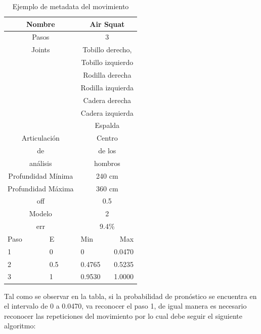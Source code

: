 \documentclass[twoside,twocolumn]{article}
\begin{document}
\begin{table}[H]
\caption{Ejemplo de metadata del movimiento}
\centering
\begin{tabular}{lllr}
\toprule
\multicolumn{2}{c}{Nombre}  & \multicolumn{2}{c}{Air Squat}\\
\midrule
\multicolumn{2}{c}{Pasos}   & \multicolumn{2}{c}{3} 		   \\
\midrule
\multicolumn{2}{c}{Joints}   & \multicolumn{2}{c}{Tobillo derecho,} 		   \\
\multicolumn{2}{c}{}   & \multicolumn{2}{c}{Tobillo izquierdo} 		   \\
\multicolumn{2}{c}{}   & \multicolumn{2}{c}{Rodilla derecha} 		   \\
\multicolumn{2}{c}{}   & \multicolumn{2}{c}{Rodilla izquierda} 		   \\
\multicolumn{2}{c}{}   & \multicolumn{2}{c}{Cadera derecha} 		   \\
\multicolumn{2}{c}{}   & \multicolumn{2}{c}{Cadera  izquierda} 		   \\
\multicolumn{2}{c}{}   & \multicolumn{2}{c}{Espalda} 		   \\
\midrule
\multicolumn{2}{c}{Articulación}   & \multicolumn{2}{c}{Centro} 		   \\
\multicolumn{2}{c}{de}   & \multicolumn{2}{c}{de los} 		   \\
\multicolumn{2}{c}{análisis}   & \multicolumn{2}{c}{hombros} 		   \\
\midrule
\multicolumn{2}{c}{Profundidad Mínima}   & \multicolumn{2}{c}{240 cm} 	 \\
\midrule
\multicolumn{2}{c}{Profundidad Máxima}   & \multicolumn{2}{c}{360 cm} 		   \\
\midrule
\multicolumn{2}{c}{off}  & \multicolumn{2}{c}{0.5} 	   \\
\midrule
\multicolumn{2}{c}{Modelo}  & \multicolumn{2}{c}{2} 		   \\
\midrule
\multicolumn{2}{c}{err}   & \multicolumn{2}{c}{9.4\%}    \\
\midrule
Paso    & E        & Min    & Max        \\
1 		& 0   	   & 0 	    & 0.0470     \\
2 		& 0.5      & 0.4765 & 0.5235     \\
3 		& 1        & 0.9530 & 1.0000     \\
\bottomrule
\end{tabular}
\end{table}
\medbreak 
Tal como se observar en la tabla, si la probabilidad de pronóstico se encuentra en el intervalo de 0 a 0.0470, va reconocer el paso 1, de igual manera es necesario reconocer las repeticiones del movimiento por lo cual debe seguir el siguiente algoritmo:
\end{document}

